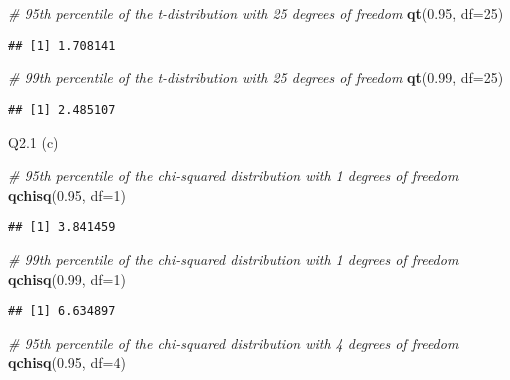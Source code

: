 \documentclass[
]{article}
\newenvironment{Shaded}{\begin{snugshade}}{\end{snugshade}}
\newcommand{\AttributeTok}[1]{\textcolor[rgb]{0.13,0.29,0.53}{#1}}
\newcommand{\CommentTok}[1]{\textcolor[rgb]{0.56,0.35,0.01}{\textit{#1}}}
\newcommand{\DecValTok}[1]{\textcolor[rgb]{0.00,0.00,0.81}{#1}}
\newcommand{\FloatTok}[1]{\textcolor[rgb]{0.00,0.00,0.81}{#1}}
\newcommand{\FunctionTok}[1]{\textcolor[rgb]{0.13,0.29,0.53}{\textbf{#1}}}
\newcommand{\NormalTok}[1]{#1}
\begin{document}
\begin{Shaded}
\begin{Highlighting}[]
\CommentTok{\# 95th percentile of the t{-}distribution with 25 degrees of freedom}
\FunctionTok{qt}\NormalTok{(}\FloatTok{0.95}\NormalTok{, }\AttributeTok{df=}\DecValTok{25}\NormalTok{)}
\end{Highlighting}
\end{Shaded}

\begin{verbatim}
## [1] 1.708141
\end{verbatim}

\begin{Shaded}
\begin{Highlighting}[]
\CommentTok{\# 99th percentile of the t{-}distribution with 25 degrees of freedom}
\FunctionTok{qt}\NormalTok{(}\FloatTok{0.99}\NormalTok{, }\AttributeTok{df=}\DecValTok{25}\NormalTok{)}
\end{Highlighting}
\end{Shaded}

\begin{verbatim}
## [1] 2.485107
\end{verbatim}

Q2.1 (c)

\begin{Shaded}
\begin{Highlighting}[]
\CommentTok{\# 95th percentile of the chi{-}squared distribution with 1 degrees of freedom}
\FunctionTok{qchisq}\NormalTok{(}\FloatTok{0.95}\NormalTok{, }\AttributeTok{df=}\DecValTok{1}\NormalTok{)}
\end{Highlighting}
\end{Shaded}

\begin{verbatim}
## [1] 3.841459
\end{verbatim}

\begin{Shaded}
\begin{Highlighting}[]
\CommentTok{\# 99th percentile of the chi{-}squared distribution with 1 degrees of freedom}
\FunctionTok{qchisq}\NormalTok{(}\FloatTok{0.99}\NormalTok{, }\AttributeTok{df=}\DecValTok{1}\NormalTok{)}
\end{Highlighting}
\end{Shaded}

\begin{verbatim}
## [1] 6.634897
\end{verbatim}

\begin{Shaded}
\begin{Highlighting}[]
\CommentTok{\# 95th percentile of the chi{-}squared distribution with 4 degrees of freedom}
\FunctionTok{qchisq}\NormalTok{(}\FloatTok{0.95}\NormalTok{, }\AttributeTok{df=}\DecValTok{4}\NormalTok{)}
\end{Highlighting}
\end{Shaded}
\end{document}
